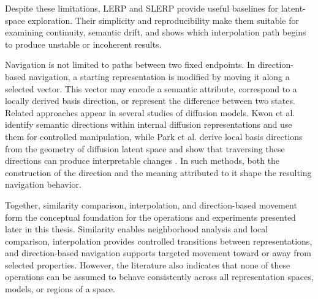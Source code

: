Despite these limitations, LERP and SLERP provide useful baselines for latent-space exploration. Their simplicity and reproducibility make them suitable for examining continuity, semantic drift, and shows which interpolation path begins to produce unstable or incoherent results.

Navigation is not limited to paths between two fixed endpoints. In direction-based navigation, a starting representation is modified by moving it along a selected vector. This vector may encode a semantic attribute, correspond to a locally derived basis direction, or represent the difference between two states. Related approaches appear in several studies of diffusion models. Kwon et al. identify semantic directions within internal diffusion representations and use them for controlled manipulation, while Park et al. derive local basis directions from the geometry of diffusion latent space and show that traversing these directions can produce interpretable changes \cite{kwon2023semantic,park2023riemannian}. In such methods, both the construction of the direction and the meaning attributed to it shape the resulting navigation behavior.

Together, similarity comparison, interpolation, and direction-based movement form the conceptual foundation for the operations and experiments presented later in this thesis. Similarity enables neighborhood analysis and local comparison, interpolation provides controlled transitions between representations, and direction-based navigation supports targeted movement toward or away from selected properties. However, the literature also indicates that none of these operations can be assumed to behave consistently across all representation spaces, models, or regions of a space.
